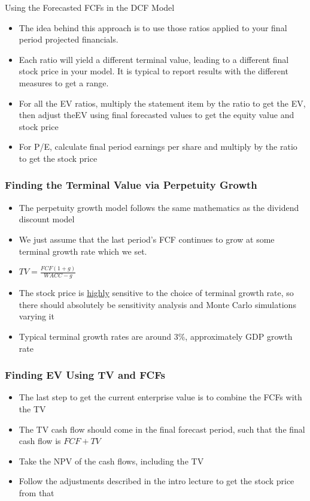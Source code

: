 \documentclass[handout, 11pt]{beamer}
\begin{document}
\begin{section}[Valuation]{Using the Forecasted FCFs in the DCF Model}
\begin{frame}
\begin{itemize}
\vfill
\item The idea behind this approach is to use those ratios applied to your final period projected financials.
\vfill
\item Each ratio will yield a different terminal value, leading to a different final stock price in your model. It is typical to report results with the different measures to get a range.
\vfill
\item For all the EV ratios, multiply the statement item by the ratio to get the EV, then adjust theEV using final forecasted values to get the equity value and stock price
\vfill
\item For P/E, calculate final period earnings per share and multiply by the ratio to get the stock price
\end{itemize}
\end{frame}
\begin{frame}
\frametitle{Finding the Terminal Value via Perpetuity Growth}
\begin{itemize}
\item The perpetuity growth model follows the same mathematics as the dividend discount model
\vfill
\item We just assume that the last period's FCF continues to grow at some terminal growth rate which we set.
\vfill
\item $TV = \frac{FCF (1 + g)}{WACC - g}$
\vfill
\item The stock price is
\underline{highly}
sensitive to the choice of terminal growth rate, so there should absolutely be sensitivity analysis and Monte Carlo simulations varying it
\vfill
\item Typical terminal growth rates are around 3\%, approximately GDP growth rate
\end{itemize}
\end{frame}
\begin{frame}
\frametitle{Finding EV Using TV and FCFs}
\begin{itemize}
\item The last step to get the current enterprise value is to combine the FCFs with the TV
\vfill
\item The TV cash flow should come in the final forecast period, such that the final cash flow is $FCF + TV$
\vfill
\item Take the NPV of the cash flows, including the TV
\vfill
\item Follow the adjustments described in the intro lecture to get the stock price from that
\end{itemize}

\end{frame}
\end{section}
\end{document}
